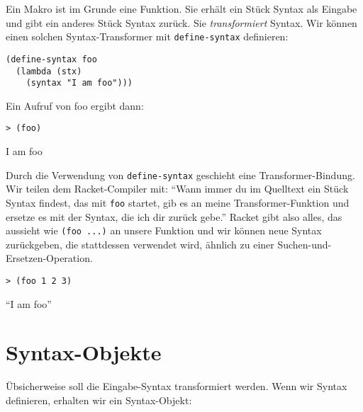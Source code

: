 Ein Makro ist im Grunde eine Funktion. Sie erhält ein Stück Syntax als Eingabe und gibt ein anderes Stück Syntax zurück. Sie \textit{transformiert} Syntax. Wir können einen solchen Syntax-Transformer mit \texttt{define-syntax} definieren:

\begin{lstlisting}
(define-syntax foo
  (lambda (stx)
    (syntax "I am foo")))
\end{lstlisting}

Ein Aufruf von foo ergibt dann:

\begin{lstlisting}
> (foo)
\end{lstlisting}
{\routput {\qq}I am foo{\qq}}

Durch die Verwendung von \texttt{define-syntax} geschieht eine Transformer-Bindung. Wir teilen dem Racket-Compiler mit: ``Wann immer du im Quelltext ein Stück Syntax findest, das mit \texttt{foo} startet, gib es an meine Transformer-Funktion und ersetze es mit der Syntax, die ich dir zurück gebe.'' Racket gibt also alles, das aussieht wie \texttt{(foo ...)} an unsere Funktion und wir können neue Syntax zurückgeben, die stattdessen verwendet wird, ähnlich zu einer Suchen-und-Ersetzen-Operation.

\begin{lstlisting}
> (foo 1 2 3)
\end{lstlisting}
{\routput ``I am foo''}


%   
% 

%   


\section{Syntax-Objekte}
Übsicherweise soll die Eingabe-Syntax transformiert werden. Wenn wir Syntax definieren, erhalten wir ein Syntax-Objekt:

